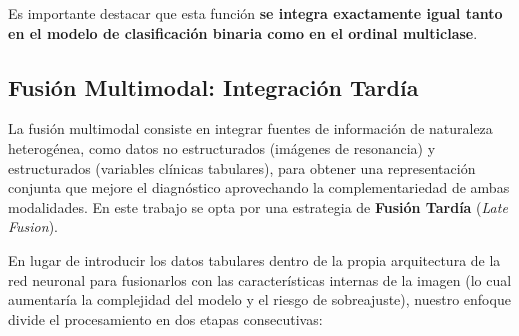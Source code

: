 \documentclass[12pt, oneside, english, spanish]{book}
\begin{document}
Es importante destacar que esta función \textbf{se integra exactamente igual tanto en el modelo de clasificación binaria como en el ordinal multiclase}.

\subsection{Fusión Multimodal: Integración Tardía} \label{subsec:fusion_multimodal_teoria}

La fusión multimodal consiste en integrar fuentes de información de naturaleza heterogénea, como datos no estructurados (imágenes de resonancia) y estructurados (variables clínicas tabulares), para obtener una representación conjunta que mejore el diagnóstico aprovechando la complementariedad de ambas modalidades. En este trabajo se opta por una estrategia de \textbf{Fusión Tardía} (\textit{Late Fusion}).

En lugar de introducir los datos tabulares dentro de la propia arquitectura de la red neuronal para fusionarlos con las características internas de la imagen (lo cual aumentaría la complejidad del modelo y el riesgo de sobreajuste), nuestro enfoque divide el procesamiento en dos etapas consecutivas:
\end{document}
